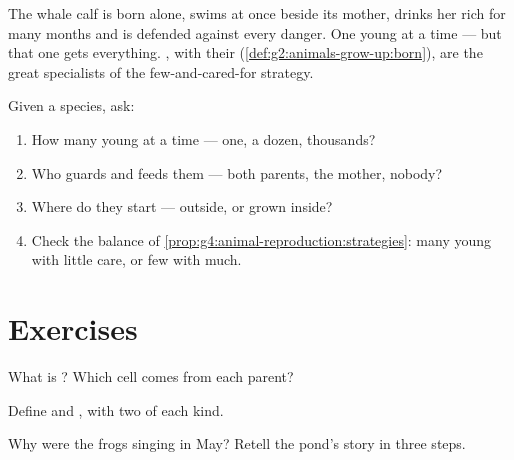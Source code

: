 \begin{example}\label{ex:g4:animal-reproduction:whalecalf}
The whale calf is born alone, swims at once beside its mother,
drinks her rich  for many months and is defended against
every danger. One young at a time --- but that one gets
everything. , with their 
(\cref{def:g2:animals-grow-up:born}), are the great
specialists of the few-and-cared-for strategy.
\end{example}

\begin{method}\label{met:g4:animal-reproduction:read}
Given a species, ask:
\begin{enumerate}
  \item How many young at a time --- one, a dozen, thousands?
  \item Who guards and feeds them --- both parents, the mother,
        nobody?
  \item Where do they start ---  outside, or grown inside?
  \item Check the balance of
        \cref{prop:g4:animal-reproduction:strategies}: many
        young with little care, or few with much.
\end{enumerate}
\end{method}

\section{Exercises}

\begin{exercise}[$\star$]\label{exo:g4:animal-reproduction:1}
What is ? Which cell comes from each parent?
\end{exercise}

\begin{exercise}[$\star$]\label{exo:g4:animal-reproduction:2}
Define  and , with two  of each
kind.
\end{exercise}

\begin{exercise}[$\star$]\label{exo:g4:animal-reproduction:3}
Why were the frogs singing in May? Retell the pond's story in
three steps.
\end{exercise}

